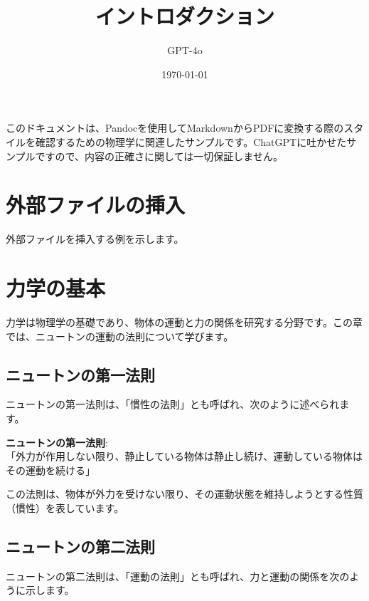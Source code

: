 \documentclass[
  11pt,
  a4paper]{ltjsarticle}
\title{イントロダクション}
\author{GPT-4o}
\date{\today}
\begin{document}
\maketitle

このドキュメントは、Pandocを使用してMarkdownからPDFに変換する際のスタイルを確認するための物理学に関連したサンプルです。ChatGPTに吐かせたサンプルですので、内容の正確さに関しては一切保証しません。

\section{外部ファイルの挿入}\label{ux5916ux90e8ux30d5ux30a1ux30a4ux30ebux306eux633fux5165}

外部ファイルを挿入する例を示します。

\section{力学の基本}\label{ux529bux5b66ux306eux57faux672c}

力学は物理学の基礎であり、物体の運動と力の関係を研究する分野です。この章では、ニュートンの運動の法則について学びます。

\subsection{ニュートンの第一法則}\label{ux30cbux30e5ux30fcux30c8ux30f3ux306eux7b2cux4e00ux6cd5ux5247}

ニュートンの第一法則は、「慣性の法則」とも呼ばれ、次のように述べられます。

\begin{tcolorbox}

\textbf{ニュートンの第一法則}:\\
「外力が作用しない限り、静止している物体は静止し続け、運動している物体はその運動を続ける」

\end{tcolorbox}

この法則は、物体が外力を受けない限り、その運動状態を維持しようとする性質（慣性）を表しています。

\subsection{ニュートンの第二法則}\label{ux30cbux30e5ux30fcux30c8ux30f3ux306eux7b2cux4e8cux6cd5ux5247}

ニュートンの第二法則は、「運動の法則」とも呼ばれ、力と運動の関係を次のように示します。
\end{document}
